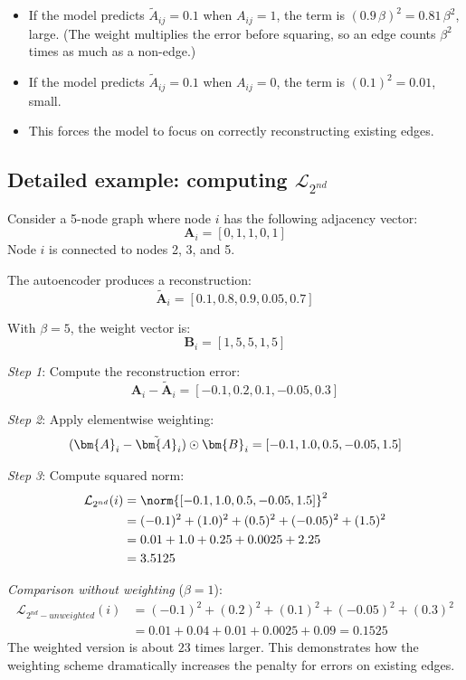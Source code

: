 \begin{notechapter}
\begin{intuition}
\begin{itemize}
    \item If the model predicts $\tilde{A}_{ij} = 0.1$ when $A_{ij} = 1$, the term is $(0.9\,\beta)^2 = 0.81\,\beta^2$, large. (The weight multiplies the error before squaring, so an edge counts $\beta^2$ times as much as a non-edge.)
    \item If the model predicts $\tilde{A}_{ij} = 0.1$ when $A_{ij} = 0$, the term is $(0.1)^2 = 0.01$, small.
    \item This forces the model to focus on correctly reconstructing existing edges.
\end{itemize}
\end{intuition}

\subsection{Detailed example: computing $\mathcal{L}_{2^{nd}}$}

\begin{example}
Consider a 5-node graph where node $i$ has the following adjacency vector:
\[
\bm{A}_i = [0, 1, 1, 0, 1]
\]
Node $i$ is connected to nodes 2, 3, and 5.

The autoencoder produces a reconstruction:
\[
\tilde{\bm{A}}_i = [0.1, 0.8, 0.9, 0.05, 0.7]
\]

With $\beta = 5$, the weight vector is:
\[
\bm{B}_i = [1, 5, 5, 1, 5]
\]

\emph{Step 1}: Compute the reconstruction error:
\[
\bm{A}_i - \tilde{\bm{A}}_i = [-0.1, 0.2, 0.1, -0.05, 0.3]
\]

\emph{Step 2}: Apply elementwise weighting:
\[
(\bm{A}_i - \tilde{\bm{A}}_i) \hadamard \bm{B}_i = [-0.1, 1.0, 0.5, -0.05, 1.5]
\]

\emph{Step 3}: Compute squared norm:
\begin{align*}
\mathcal{L}_{2^{nd}}(i) &= \norm{[-0.1, 1.0, 0.5, -0.05, 1.5]}^2 \\
&= (-0.1)^2 + (1.0)^2 + (0.5)^2 + (-0.05)^2 + (1.5)^2 \\
&= 0.01 + 1.0 + 0.25 + 0.0025 + 2.25 \\
&= 3.5125
\end{align*}

\emph{Comparison without weighting} ($\beta = 1$):
\begin{align*}
\mathcal{L}_{2^{nd}-{unweighted}}(i) &= (-0.1)^2 + (0.2)^2 + (0.1)^2 + (-0.05)^2 + (0.3)^2 \\
&= 0.01 + 0.04 + 0.01 + 0.0025 + 0.09 = 0.1525
\end{align*}
The weighted version is about $23$ times larger. This demonstrates how the weighting scheme dramatically increases the penalty for errors on existing edges.
\end{example}


\end{notechapter}
